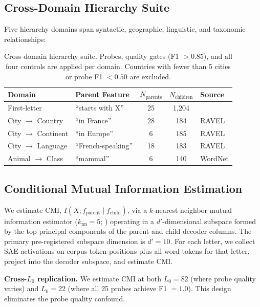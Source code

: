 \documentclass{article}
\begin{document}
\subsection{Cross-Domain Hierarchy Suite}
\label{sec:crossdomain}

Five hierarchy domains span syntactic, geographic, linguistic, and taxonomic relationships:

\begin{table}[t]
\caption{Cross-domain hierarchy suite. Probes, quality gates (F1 $> 0.85$), and all four controls are applied per domain. Countries with fewer than 5 cities or probe F1 $< 0.50$ are excluded.}
\label{tab:domains}
\centering
\small
\begin{tabular}{llccl}
\toprule
Domain & Parent Feature & $N_{\text{parents}}$ & $N_{\text{children}}$ & Source \\
\midrule
First-letter & ``starts with X'' & 25 & 1,204 & \citet{chanin2024absorption} \\
City $\to$ Country & ``in France'' & 28 & 184 & RAVEL \\
City $\to$ Continent & ``in Europe'' & 6 & 185 & RAVEL \\
City $\to$ Language & ``French-speaking'' & 18 & 183 & RAVEL \\
Animal $\to$ Class & ``mammal'' & 6 & 140 & WordNet \\
\bottomrule
\end{tabular}
\end{table}

\subsection{Conditional Mutual Information Estimation}

We estimate CMI, $I(X; f_{\text{parent}} \mid f_{\text{child}})$, via a $k$-nearest neighbor mutual information estimator ($k_{\text{nn}} = 5$; \citealt{kraskov2004estimating}) operating in a $d'$-dimensional subspace formed by the top principal components of the parent and child decoder columns. The primary pre-registered subspace dimension is $d' = 10$. For each letter, we collect SAE activations on corpus token positions plus all word tokens for that letter, project into the decoder subspace, and estimate CMI.

\textbf{Cross-$L_0$ replication.} We estimate CMI at both $L_0 = 82$ (where probe quality varies) and $L_0 = 22$ (where all 25 probes achieve F1 $= 1.0$). This design eliminates the probe quality confound.
\end{document}
